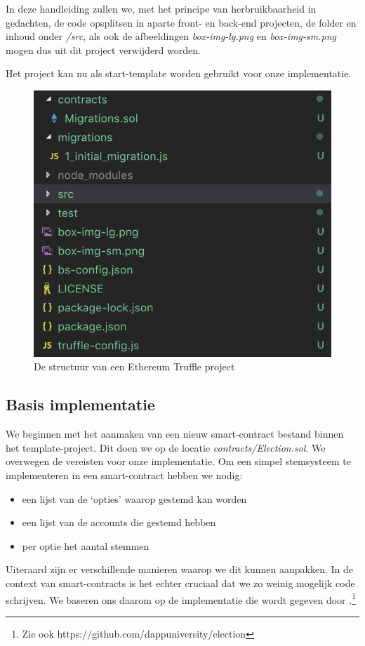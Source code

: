 	In deze handleiding zullen we, met het principe van herbruikbaarheid in gedachten, de code opsplitsen in aparte front- en back-end projecten, de folder en inhoud onder \textit{\slash src}, als ook de afbeeldingen \textit{box-img-lg.png} en \textit{box-img-sm.png} mogen dus uit dit project verwijderd worden.
	
	Het project kan nu als start-template worden gebruikt voor onze implementatie.
	
	\begin{figure}
		\centering
		\includegraphics[width=\linewidth/2]{img/truffle-template.png}
		\caption{De structuur van een Ethereum Truffle project}
		\label{fig:truffle-template}
	\end{figure}
	
	\subsection{Basis implementatie}
	We beginnen met het aanmaken van een nieuw smart-contract bestand binnen het template-project. Dit doen we op de locatie \textit{contracts\slash Election.sol}. We overwegen de vereisten voor onze implementatie. Om een simpel stemsysteem te implementeren in een smart-contract hebben we nodig:
	\begin{itemize}
		\item een lijst van de `opties' waarop gestemd kan worden
		\item een lijst van de accounts die gestemd hebben
		\item per optie het aantal stemmen
	\end{itemize}
	Uiteraard zijn er verschillende manieren waarop we dit kunnen aanpakken. In de context van smart-contracts is het echter cruciaal dat we zo weinig mogelijk code schrijven. We baseren ons daarom op de implementatie die wordt gegeven door \textcite{McCubin2019}.\footnote{Zie ook https://github.com/dappuniversity/election}
	
